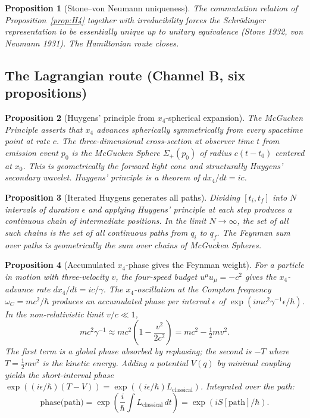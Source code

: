 \documentclass[11pt,a4paper]{article}
\newtheorem{proposition}{Proposition}
\begin{document}
\begin{proposition}[Stone--von Neumann uniqueness]
\label{prop:H5}
The commutation relation of Proposition~\ref{prop:H4} together with irreducibility forces the Schr\"odinger representation to be essentially unique up to unitary equivalence (Stone 1932, von Neumann 1931). The Hamiltonian route closes.
\end{proposition}

\subsection{The Lagrangian route (Channel B, six propositions)}

\begin{proposition}[Huygens' principle from $x_4$-spherical expansion]
\label{prop:L1}
The McGucken Principle asserts that $x_4$ advances spherically symmetrically from every spacetime point at rate $c$. The three-dimensional cross-section at observer time $t$ from emission event $p_0$ is the McGucken Sphere $\Sigma_+(p_0)$ of radius $c(t-t_0)$ centered at $x_0$. This is geometrically the forward light cone and structurally Huygens' secondary wavelet. Huygens' principle is a theorem of $dx_4/dt = ic$.
\end{proposition}

\begin{proposition}[Iterated Huygens generates all paths]
\label{prop:L2}
Dividing $[t_i, t_f]$ into $N$ intervals of duration $\epsilon$ and applying Huygens' principle at each step produces a continuous chain of intermediate positions. In the limit $N \to \infty$, the set of all such chains is the set of all continuous paths from $q_i$ to $q_f$. The Feynman sum over paths is geometrically the sum over chains of McGucken Spheres.
\end{proposition}

\begin{proposition}[Accumulated $x_4$-phase gives the Feynman weight]
\label{prop:L3}
For a particle in motion with three-velocity $v$, the four-speed budget $u^\mu u_\mu = -c^2$ gives the $x_4$-advance rate $dx_4/dt = ic/\gamma$. The $x_4$-oscillation at the Compton frequency $\omega_C = mc^2/\hbar$ produces an accumulated phase per interval $\epsilon$ of $\exp(i mc^2\gamma^{-1} \epsilon/\hbar)$. In the non-relativistic limit $v/c \ll 1$,
\begin{equation}
mc^2\gamma^{-1} \approx mc^2\left(1 - \frac{v^2}{2c^2}\right) = mc^2 - \tfrac{1}{2}mv^2.
\end{equation}
The first term is a global phase absorbed by rephasing; the second is $-T$ where $T = \tfrac{1}{2}mv^2$ is the kinetic energy. Adding a potential $V(q)$ by minimal coupling yields the short-interval phase $\exp((i\epsilon/\hbar)(T-V)) = \exp((i\epsilon/\hbar) L_{\text{classical}})$. Integrated over the path:
\begin{equation}
\text{phase(path)} = \exp\left(\frac{i}{\hbar} \int L_{\text{classical}}\,dt\right) = \exp(iS[\text{path}]/\hbar).
\end{equation}
\end{proposition}
\end{document}
